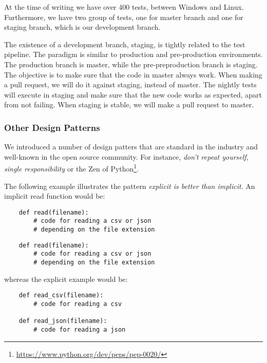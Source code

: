 At the time of writing we have over 400 tests, between Windows and Linux. Furthermore, we have two group of tests,
one for master branch and one for staging branch, which is our development branch.

The existence of a development branch, staging, is tightly related to the test pipeline. The paradigm is similar to
production and pre-production environments. The production branch is master, while the pre-preproduction branch is staging.
The objective is to make sure that the code in master always work. When making a pull request, we will
do it against staging, instead of master. The nightly tests will execute in staging and make sure that the new code 
works as expected, apart from not failing. When staging is stable, we will make a pull request to master.  


\subsubsection{Other Design Patterns}

We introduced a number of design patters that are standard in the industry and well-known
in the open source community. For instance, \textit{don't repeat yourself}, \textit{single
responsibility} or the Zen of Python\footnote{\url{https://www.python.org/dev/peps/pep-0020/}}. 

The following example illustrates the pattern \textit{explicit is better than implicit}.
An implicit read function would be: 
\begin{verbatim}
    def read(filename):
        # code for reading a csv or json
        # depending on the file extension
\end{verbatim}

\begin{verbatim}
    def read(filename):
        # code for reading a csv or json
        # depending on the file extension
\end{verbatim}

whereas the explicit example would be:
\begin{verbatim}
    def read_csv(filename):
        # code for reading a csv

    def read_json(filename):
        # code for reading a json
\end{verbatim}



